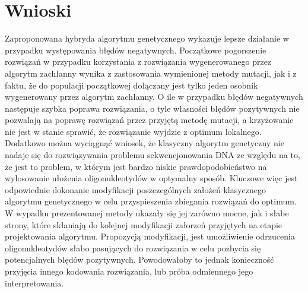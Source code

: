 \documentclass{article}
\begin{document}
\section{Wnioski}
Zaproponowana hybryda algorytmu genetycznego wykazuje lepsze działanie w przypadku występowania błędów negatywnych. Początkowe pogorszenie rozwiązań w przypadku korzystania z rozwiązania wygenerowanego przez algorytm zachłanny wynika z zastosowania wymienionej metody mutacji, jak i z faktu, że do populacji początkowej dołączany jest tylko jeden osobnik wygenerowany przez algorytm zachłanny. O ile w przypadku błędów negatywnych następuje szybka poprawa rozwiązania, o tyle własności błędów pozytywnych nie pozwalają na poprawę rozwiązań przez przyjętą metodę mutacji, a krzyżowanie nie jest w stanie sprawić, że rozwiązanie wyjdzie z optimum lokalnego. Dodatkowo można wyciągnąć wniosek, że klasyczny algorytm genetyczny nie nadaje się do rozwiązywania problemu sekwencjonowania DNA ze względu na to, że jest to problem, w którym jest bardzo niskie prawdopodobieństwo na wylosowanie ułożenia oligonukleotydów w optymalny sposób. Kluczowe więc jest odpowiednie dokonanie modyfikacji poszczególnych  założeń klasycznego algorytmu genetycznego w celu przyspieszenia zbiegania rozwiązań do optimum. W wypadku prezentowanej metody ukazały się jej zarówno mocne, jak i słabe strony, które skłaniają do kolejnej modyfikacji załorzeń przyjętych na etapie projektowania algorytmu. Propozycją modyfikacji, jest umożliwienie odrzucenia oligonukleotydów słabo pasujących do rozwiązania w celu pozbycia się potencjalnych błędów pozytywnych. Powodowałoby to jednak konieczność przyjęcia innego kodowania rozwiązania, lub próba odmiennego jego interpretowania.
\end{document}
